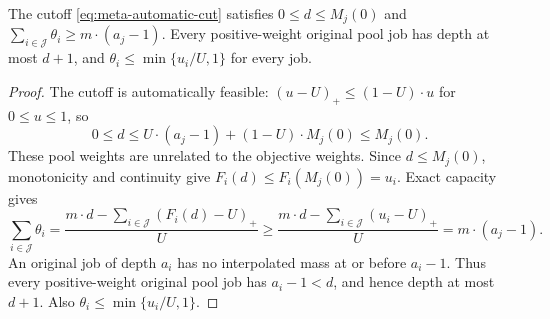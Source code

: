 \begin{lemma}
\label{lem:partial-pool}
The cutoff \eqref{eq:meta-automatic-cut} satisfies $0\le d\le M_j(0)$ and
$\sum_{i\in\mathcal J}\theta_i\ge m\cdot(a_j-1)$. Every positive-weight original pool job has
depth at most $d+1$, and $\theta_i\le\min\{u_i/U,1\}$ for every job.
\end{lemma}
\begin{proof}
The cutoff is automatically feasible: $(u-U)_+\le(1-U)\cdot u$ for
$0\le u\le1$, so
\[
 0\le d\le U\cdot(a_j-1)+(1-U)\cdot M_j(0)\le M_j(0).
\]
These pool weights are unrelated to the objective weights. Since
$d\le M_j(0)$, monotonicity and continuity give $F_i(d)\le F_i(M_j(0))=u_i$.
Exact capacity gives
\[
 \sum_{i\in\mathcal J}\theta_i=\frac{m\cdot d-\sum_{i\in\mathcal J}(F_i(d)-U)_+}{U}
 \ge\frac{m\cdot d-\sum_{i\in\mathcal J}(u_i-U)_+}{U}=m\cdot(a_j-1).
\]
An original job of depth $a_i$ has no interpolated mass at or before
$a_i-1$. Thus every positive-weight original pool job has
$a_i-1<d$, and hence depth at most $d+1$. Also
$\theta_i\le\min\{u_i/U,1\}$.
\end{proof}


